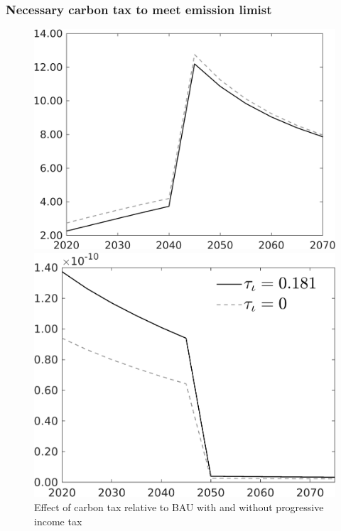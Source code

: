 \subsubsection{Necessary carbon tax to meet emission limist}\label{app:neccab}
 \begin{figure}[h!!]
	\centering
	\caption{Effect of carbon tax relative to BAU with and without progressive income tax }\label{fig:Limit_nsk0_xgr0_know_app}		
	\begin{minipage}[]{0.32\textwidth}
		\includegraphics[width=1\textwidth]{../../codding_model/own_basedOnFried/optimalPol_010922_revision/figures/all_13Sept22/CompTauf_bytaul_Reg0_gAg_spillover0_nsk0_xgr0_knspil0_sep0_LFlimit1_emsbase0_countec0_GovRev0_etaa0.79_lgd0.png}
	\end{minipage}	
	\begin{minipage}[]{0.32\textwidth}
		\includegraphics[width=1\textwidth]{../../codding_model/own_basedOnFried/optimalPol_010922_revision/figures/all_13Sept22/CompTauf_bytaul_Reg0_sff_spillover0_nsk0_xgr0_knspil0_sep0_LFlimit1_emsbase0_countec0_GovRev0_etaa0.79_lgd1.png}

\end{minipage}
\end{figure}
